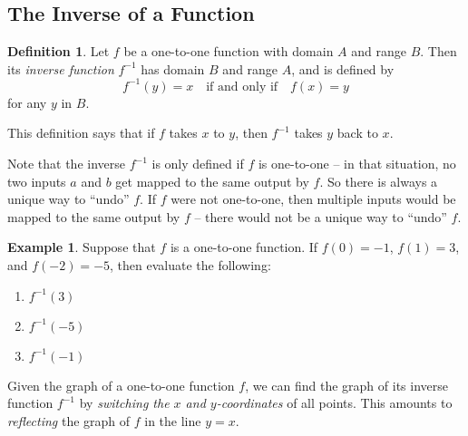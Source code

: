 \documentclass[letterpaper,12pt,oneside]{book}
\theoremstyle{definition}
\newtheorem{definition}[theorem]{Definition}
\newtheorem{example}[theorem]{Example}
\begin{document}
{\newpage

\subsection*{The Inverse of a Function}

\begin{definition}
Let $f$ be a one-to-one function with domain $A$ and range $B$.  Then its \emph{inverse function} $f^{-1}$ has domain $B$ and range $A$, and is defined by
\[
f^{-1}(y)=x \ \ \ \mbox{ if and only if } \ \ \  f(x)=y 
\]
for any $y$ in $B$.
\end{definition}

\noindent
This definition says that if $f$ takes $x$ to $y$, then $f^{-1}$ takes $y$ back to $x$.  

Note that the inverse $f^{-1}$ is only defined if $f$ is one-to-one -- in that situation, no two inputs $a$ and $b$ get mapped to the same output by $f$.  So there is always a unique way to ``undo'' $f$.  If $f$ were not one-to-one, then multiple inputs would be mapped to the same output by $f$ -- there would not be a unique way to ``undo'' $f$. 

\begin{example}
Suppose that $f$ is a one-to-one function.  If $f(0)=-1$, $f(1)=3$, and $f(-2)=-5$, then evaluate the following:
\begin{enumerate}
\item $f^{-1}(3)$
\item $f^{-1}(-5)$
\item $f^{-1}(-1)$
\end{enumerate}
\end{example}

\noindent
Given the graph of a one-to-one function $f$, we can find the graph of its inverse function $f^{-1}$ by \emph{switching the $x$ and $y$-coordinates} of all points.  This amounts to \emph{reflecting} the graph of $f$ in the line $y=x$.

\begin{center}
\end{center}

}
\end{document}
